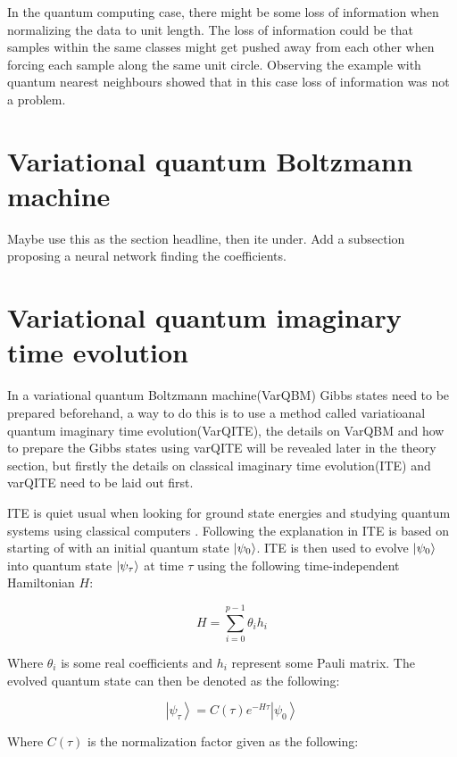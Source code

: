 \documentclass[../main.tex]{subfiles}
\begin{document}
In the quantum computing case, there might be some loss of information when normalizing the data to unit length. The loss of information could be that samples within the same classes might get pushed away from each other when forcing each sample along the same unit circle. Observing the example with quantum nearest neighbours showed that in this case loss of information was not a problem.


\section{Variational quantum Boltzmann machine}
Maybe use this as the section headline, then ite under.
Add a subsection proposing a neural network finding the coefficients.

\section{Variational quantum imaginary time evolution}
\label{sec:VarITE}
In a variational quantum Boltzmann machine(VarQBM) Gibbs states need to be prepared beforehand, a way to do this is to use a method called variatioanal quantum imaginary time evolution(VarQITE), the details on VarQBM and how to prepare the Gibbs states using varQITE will be revealed later in the theory section, but firstly the details on classical imaginary time evolution(ITE) and varQITE need to be laid out first.

ITE is quiet usual when looking for ground state energies and studying quantum systems using classical computers \cite{McArdle_2019}. Following the explanation in \cite{VQB:litteraturelist} ITE is based on starting of with an initial quantum state $\ket{\psi_0}$. ITE is then used to evolve $\ket{\psi_0}$ into quantum state $\ket{\psi_\tau}$ at time $\tau$ using the following time-independent Hamiltonian $H$:

\begin{equation}
H=\sum_{i=0}^{p-1} \theta_{i} h_{i}
\end{equation}

Where $\theta_i$ is some real coefficients and $h_i$ represent some Pauli matrix. The evolved quantum state can then be denoted as the following:

\begin{equation}
\left|\psi_{\tau}\right\rangle=C(\tau) e^{-H \tau}\left|\psi_{0}\right\rangle
\end{equation}

Where $C(\tau)$ is the normalization factor given as the following:
\end{document}
